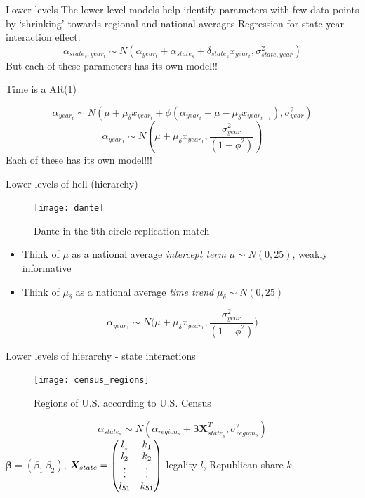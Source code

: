 \documentclass{beamer}
\begin{document}
	\begin{frame}{Lower levels}
		The lower level models help identify parameters with few data points by `shrinking' towards regional and national averages
		Regression for state year interaction effect:
		\begin{equation}
		\alpha_{state_s,year_t} \sim N(\alpha_{year_t} + \alpha_{state_s} + \delta_{state_s}x_{year_t}, \sigma^2_{state, year})
		\end{equation}
		But each of these parameters has its own model!! \\ \begin{center} Time is a AR(1) \end{center}
		\begin{equation}
		\alpha_{year_t} \sim N(\mu + \mu_{\delta}x_{year_t} + \phi(\alpha_{year_t}  - \mu - \mu_{\delta} x_{year_{t-1}}), \sigma^2_{year})
		\end{equation}
		\begin{equation}
		\alpha_{year_1} \sim N(\mu + \mu_{\delta} x_{year_1}, \frac{\sigma^2_{year}}{(1-\phi^2)}  ) 
		\end{equation}
		Each of these has its own model!!!
	\end{frame}
	
	\begin{frame}{Lower levels of hell (hierarchy)}
		\begin{figure} 
			\centering
	\texttt{[image: dante]}
	\caption{Dante in the 9th circle-replication match}
	\end{figure}
	\begin{itemize} 
		\item Think of $ \mu $ as a national average \textit{intercept term} $ \mu \sim N(0, 25)  $, weakly informative
		\item Think of $ \mu_{\delta} $ as a national average \textit{time trend} $ \mu_{\delta} \sim N(0, 25) $
	\end{itemize}
	\[
			\alpha_{year_1} \sim N\Big(\mu + \mu_{\delta} x_{year_1}, \frac{\sigma^2_{year}}{(1-\phi^2)}  \Big) 
	\]
	\end{frame}
	
	\begin{frame}{Lower levels of hierarchy - state interactions}
		\begin{figure}
				\texttt{[image: census\_regions]}
				\caption{Regions of U.S. according to U.S. Census}
		\end{figure}
		\begin{equation}
		\alpha_{state_s} \sim N(\alpha_{region_s} + \bm{\beta X}^{T}_{state_s}, \sigma^2_{region_s}   )
		\end{equation}
		$ \bm{\beta } = (\beta_1 \ \beta_2) $, $ \bm{X_}{state} = \begin{pmatrix}
		l_{1} & k_{1} \\
		l_{2} & k_{2} \\
		\vdots & \vdots \\
		l_{51} & k_{51} \\
		\end{pmatrix}$ legality $ l $, Republican share $ k $
	\end{frame}
	
\end{document}
